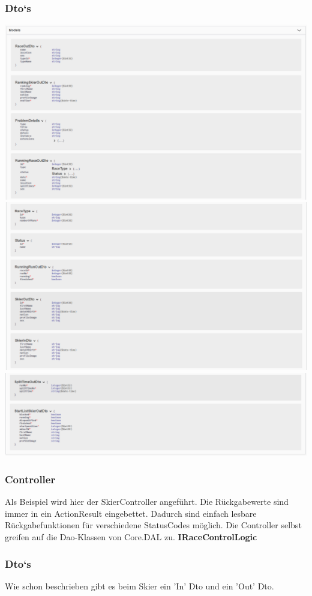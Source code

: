\documentclass[a4paper, 12pt]{article}
\begin{document}
	\subsubsection{Dto`s}
	\includegraphics[width=.7\textwidth]{img/Models_1.png}
	\newline		
	\includegraphics[width=.7\textwidth]{img/Models_2.png}
	\newline		
	\includegraphics[width=.7\textwidth]{img/Models_3.png}
	\newline		
	\subsubsection{Controller}
	Als Beispiel wird hier der SkierController angeführt. Die Rückgabewerte sind immer in ein ActionResult eingebettet. Dadurch sind einfach lesbare Rückgabefunktionen für verschiedene StatusCodes möglich. Die Controller selbst greifen auf die Dao-Klassen von Core.DAL zu.
	\textbf{IRaceControlLogic}
	
	\subsubsection{Dto`s}
	Wie schon beschrieben gibt es beim Skier ein 'In' Dto und ein 'Out' Dto.
	
	
\end{document}
